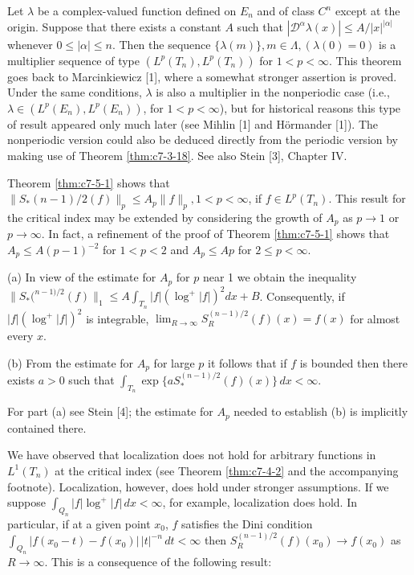  Let $\lambda$ be a complex-valued function defined on $E_n$ and of class $C^n$ except at the origin. Suppose that there exists a constant $A$ such that $|\mathcal{D}^\alpha \lambda(x)| \leq A/|x|^{|\alpha|}$ whenever $0 \leq |\alpha| \leq n$. Then the sequence $\{\lambda(m)\}, m \in \Lambda, (\lambda(0) = 0)$ is a multiplier sequence of type $(L^p(T_n), L^p(T_n))$ for $1 < p < \infty$. This theorem goes back to Marcinkiewicz [1], where a somewhat stronger assertion is proved. Under the same conditions, $\lambda$ is also a multiplier in the nonperiodic case (i.e., $\lambda \in (L^p(E_n), L^p(E_n))$, for $1 < p < \infty$), but for historical reasons this type of result appeared only much later (see Mihlin [1] and Hörmander [1]). The nonperiodic version could also be deduced directly from the periodic version by making use of Theorem \ref{thm:c7-3-18}. See also Stein [3], Chapter IV.

 Theorem \ref{thm:c7-5-1} shows that $\|S_*(n-1)/2(f)\|_p \leq A_p \|f\|_p, 1 < p < \infty$, if $f \in L^p(T_n)$. This result for the critical index may be extended by considering the growth of $A_p$ as $p \to 1$ or $p \to \infty$. In fact, a refinement of the proof of Theorem \ref{thm:c7-5-1} shows that $A_p \leq A(p-1)^{-2}$ for $1 < p < 2$ and $A_p \leq Ap$ for $2 \leq p < \infty$.

(a) In view of the estimate for $A_p$ for $p$ near 1 we obtain the inequality $\|S_*(^{n-1)/2}(f)\|_1 \leq A \int_{T_n} |f|(\log^+ |f|)^2 dx + B$. Consequently, if $|f|(\log^+ |f|)^2$ is integrable, $\lim_{R \to \infty} S_R^{(n-1)/2}(f)(x) = f(x)$ for almost every $x$.

(b) From the estimate for $A_p$ for large $p$ it follows that if $f$ is bounded then there exists $a > 0$ such that $\int_{T_n} \exp \{a S_{*}^{(n-1)/2}(f)(x)\} \, dx < \infty$.

For part (a) see Stein [4]; the estimate for $A_{p}$ needed to establish (b) is implicitly contained there.

 We have observed that localization does not hold for arbitrary functions in $L^{1}(T_{n})$ at the critical index (see Theorem \ref{thm:c7-4-2} and the accompanying footnote). Localization, however, does hold under stronger assumptions. If we suppose $\int_{Q_{n}} |f| \log^{+} |f| \, dx < \infty$, for example, localization does hold. In particular, if at a given point $x_{0}$, $f$ satisfies the Dini condition $\int_{Q_{n}} |f(x_{0}-t) - f(x_{0})| \, |t|^{-n} \, dt < \infty$ then $S_{R}^{(n-1)/2}(f)(x_{0}) \to f(x_{0})$ as $R \to \infty$. This is a consequence of the following result:

